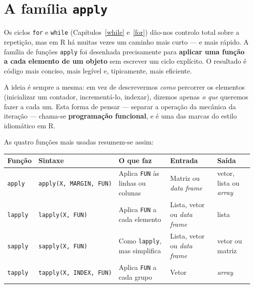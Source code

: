 \documentclass[
  portuguese,
  11pt,
  openany]{book}
\newcounter{none} %
\begin{document}
\chapter{\texorpdfstring{A família \texttt{apply}}{A família apply}}\label{apply}

Os ciclos \texttt{for} e \texttt{while} (Capítulos~\ref{while} e~\ref{for}) dão-nos controlo
total sobre a repetição, mas em R há muitas vezes um caminho mais curto --- e mais
rápido. A família de funções \texttt{apply} foi desenhada precisamente para \textbf{aplicar uma
função a cada elemento de um objeto} sem escrever um ciclo explícito. O resultado é
código mais conciso, mais legível e, tipicamente, mais eficiente.

A ideia é sempre a mesma: em vez de descrevermos \emph{como} percorrer os elementos
(inicializar um contador, incrementá-lo, indexar), dizemos apenas \emph{o que} queremos
fazer a cada um. Esta forma de pensar --- separar a operação da mecânica da iteração ---
chama-se \textbf{programação funcional}, e é uma das marcas do estilo idiomático em R.

As quatro funções mais usadas resumem-se assim:

{\def\LTcaptype{none} %
\begin{longtable}[]{@{}
  >{\raggedright\arraybackslash}p{}
  >{\raggedright\arraybackslash}p{}
  >{\raggedright\arraybackslash}p{}
  >{\raggedright\arraybackslash}p{}
  >{\raggedright\arraybackslash}p{}@{}}
\toprule\noalign{}
\begin{minipage}[b]{\linewidth}\raggedright
Função
\end{minipage} & \begin{minipage}[b]{\linewidth}\raggedright
Sintaxe
\end{minipage} & \begin{minipage}[b]{\linewidth}\raggedright
O que faz
\end{minipage} & \begin{minipage}[b]{\linewidth}\raggedright
Entrada
\end{minipage} & \begin{minipage}[b]{\linewidth}\raggedright
Saída
\end{minipage} \\
\midrule\noalign{}
\endhead
\bottomrule\noalign{}
\endlastfoot
\texttt{apply} & \texttt{apply(X,\ MARGIN,\ FUN)} & Aplica \texttt{FUN} às linhas ou colunas & Matriz ou \emph{data frame} & vetor, lista ou \emph{array} \\
\texttt{lapply} & \texttt{lapply(X,\ FUN)} & Aplica \texttt{FUN} a cada elemento & Lista, vetor ou \emph{data frame} & lista \\
\texttt{sapply} & \texttt{sapply(X,\ FUN)} & Como \texttt{lapply}, mas simplifica & Lista, vetor ou \emph{data frame} & vetor ou matriz \\
\texttt{tapply} & \texttt{tapply(X,\ INDEX,\ FUN)} & Aplica \texttt{FUN} a cada grupo & Vetor & \emph{array} \\
\end{longtable}
}
\end{document}
